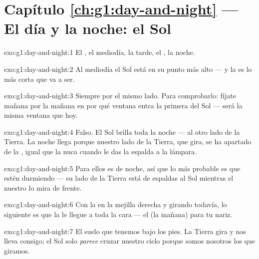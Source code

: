 \section*{Capítulo \ref{ch:g1:day-and-night} --- El día y la noche: el Sol}

\begin{solution}{exo:g1:day-and-night:1}
El , el mediodía, la tarde, el , la noche.
\end{solution}

\begin{solution}{exo:g1:day-and-night:2}
Al mediodía el Sol está en su punto más alto --- y la  es lo más
corta que va a ser.
\end{solution}

\begin{solution}{exo:g1:day-and-night:3}
Siempre por el mismo lado. Para comprobarlo: fíjate mañana por la
mañana en por qué ventana entra la primera  del Sol --- será la
misma ventana que hoy.
\end{solution}

\begin{solution}{exo:g1:day-and-night:4}
Falso. El Sol brilla toda la noche --- al otro lado de la Tierra. La
noche llega porque nuestro lado de la Tierra, que gira, se ha apartado
de la , igual que la nuca cuando le das la espalda a la lámpara.
\end{solution}

\begin{solution}{exo:g1:day-and-night:5}
Para ellos es de noche, así que lo más probable es que estén
durmiendo --- su lado de la Tierra está de espaldas al Sol mientras el
nuestro lo mira de frente.
\end{solution}

\begin{solution}{exo:g1:day-and-night:6}
Con la  en la mejilla derecha y girando todavía, lo siguiente es
que la  le llegue a toda la cara --- el  (la mañana) para
tu nariz.
\end{solution}

\begin{solution}{exo:g1:day-and-night:7}
El suelo que tenemos bajo los pies. La Tierra gira y nos lleva
consigo; el Sol solo \emph{parece} cruzar nuestro cielo porque somos
nosotros los que giramos.
\end{solution}

